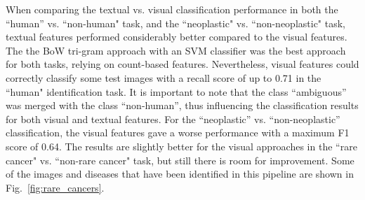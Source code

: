 \documentclass[]{spie}  %
\begin{document}
When comparing the textual vs. visual classification performance in both the ``human'' vs. ``non-human" task, and the ``neoplastic" vs. ``non-neoplastic" task, textual features performed considerably better compared to the visual features.
The the BoW tri-gram approach with an SVM classifier was the best approach for both tasks, relying on count-based features.
Nevertheless, visual features could correctly classify some test images with a recall score of up to 0.71 in the ``human" identification task.
It is important to note that the class ``ambiguous'' was merged with the class ``non-human'', thus influencing the classification results for both visual and textual features.
For the ``neoplastic'' vs. ``non-neoplastic'' classification, the visual features gave a worse performance with a maximum F1 score of 0.64.
The results are slightly better for the visual approaches in the ``rare cancer" vs. ``non-rare cancer" task, but still there is room for improvement. 
Some of the images and diseases that have been identified in this pipeline are shown in Fig.~\ref{fig:rare_cancers}.
\end{document}
